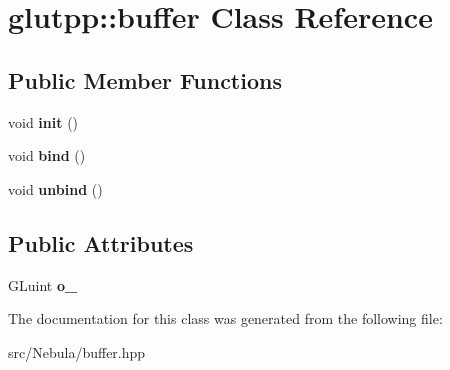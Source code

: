 \hypertarget{classglutpp_1_1buffer}{\section{glutpp\-:\-:buffer \-Class \-Reference}
\label{classglutpp_1_1buffer}
}
\subsection*{\-Public \-Member \-Functions}
\begin{DoxyCompactItemize}
\item 
\hypertarget{classglutpp_1_1buffer_a557629990348485f76e992293cfdb636}{void {\bfseries init} ()}\label{classglutpp_1_1buffer_a557629990348485f76e992293cfdb636}

\item 
\hypertarget{classglutpp_1_1buffer_a37d4b5aac0052a9724b94784205945e7}{void {\bfseries bind} ()}\label{classglutpp_1_1buffer_a37d4b5aac0052a9724b94784205945e7}

\item 
\hypertarget{classglutpp_1_1buffer_af93df84319c7d459b77c4c0c5e515119}{void {\bfseries unbind} ()}\label{classglutpp_1_1buffer_af93df84319c7d459b77c4c0c5e515119}

\end{DoxyCompactItemize}
\subsection*{\-Public \-Attributes}
\begin{DoxyCompactItemize}
\item 
\hypertarget{classglutpp_1_1buffer_a45bc4e78c108b155f79e81901b7faba1}{\-G\-Luint {\bfseries o\-\_\-}}\label{classglutpp_1_1buffer_a45bc4e78c108b155f79e81901b7faba1}

\end{DoxyCompactItemize}


\-The documentation for this class was generated from the following file\-:\begin{DoxyCompactItemize}
\item 
src/\-Nebula/buffer.\-hpp\end{DoxyCompactItemize}
